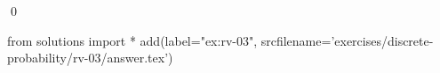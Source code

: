 
\begin{ex} 
  \label{ex:rv-03}
  
  \qed
\end{ex} 
\begin{python0}
from solutions import *
add(label="ex:rv-03",
    srcfilename='exercises/discrete-probability/rv-03/answer.tex') 
\end{python0}
